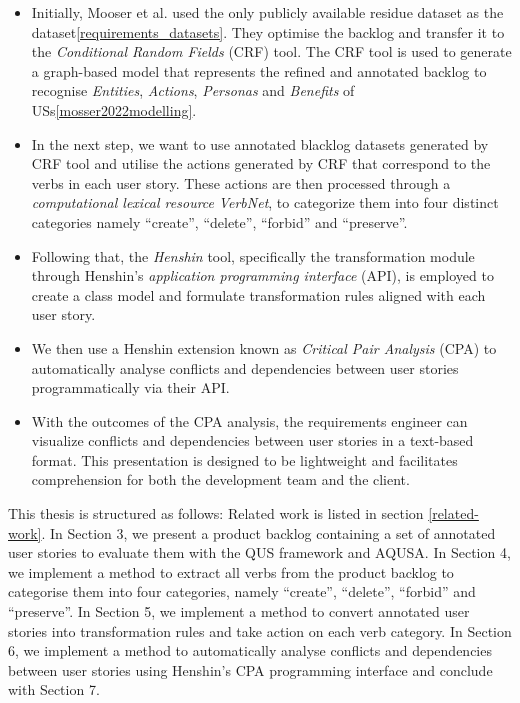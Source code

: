 \begin{itemize}
\item Initially, Mooser et al. used the only publicly available residue dataset as the dataset\ref{requirements_datasets}. They optimise the backlog and transfer it to the \emph{Conditional Random Fields} (CRF) tool. The CRF tool is used to generate a graph-based model that represents the refined and annotated backlog to recognise \emph{Entities}, \emph{Actions}, \emph{Personas} and \emph{Benefits} of USs\ref{mosser2022modelling}.
\item In the next step, we want to use annotated blacklog datasets generated by CRF tool and utilise the actions generated by CRF that correspond to the verbs in each user story. These actions are then processed through a \emph{computational lexical resource} \emph{VerbNet}, to categorize them into four distinct categories namely \enquote{create}, \enquote{delete}, \enquote{forbid} and \enquote{preserve}.
\item Following that, the \emph{Henshin} tool, specifically the transformation module through Henshin's \emph{application programming interface} (API), is employed to create a class model and formulate transformation rules aligned with each user story.
\item We then use a Henshin extension known as \emph{Critical Pair Analysis} (CPA) to automatically analyse conflicts and dependencies between user stories programmatically via their API.
\item With the outcomes of the CPA analysis, the requirements engineer can visualize conflicts and dependencies between user stories in a text-based format. This presentation is designed to be lightweight and facilitates comprehension for both the development team and the client.
\end{itemize}
This thesis is structured as follows: Related work is listed in section \ref{related-work}. In Section 3, we present a product backlog containing a set of annotated user stories to evaluate them with the QUS framework and AQUSA. In Section 4, we implement a method to extract all verbs from the product backlog to categorise them into four categories, namely \enquote{create}, \enquote{delete}, \enquote{forbid} and \enquote{preserve}. In Section 5, we implement a method to convert annotated user stories into transformation rules and take action on each verb category. In Section 6, we implement a method to automatically analyse conflicts and dependencies between user stories using Henshin's CPA programming interface and conclude with Section 7.



